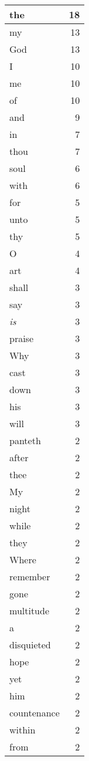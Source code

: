 \begin{center}
\begin{longtable}{l|r}
\hline \hline
\endlastfoot
the & 18 \\ \hline
my & 13 \\ \hline
God & 13 \\ \hline
I & 10 \\ \hline
me & 10 \\ \hline
of & 10 \\ \hline
and & 9 \\ \hline
in & 7 \\ \hline
thou & 7 \\ \hline
soul & 6 \\ \hline
with & 6 \\ \hline
for & 5 \\ \hline
unto & 5 \\ \hline
thy & 5 \\ \hline
O & 4 \\ \hline
art & 4 \\ \hline
shall & 3 \\ \hline
say & 3 \\ \hline
\emph{is} & 3 \\ \hline
praise & 3 \\ \hline
Why & 3 \\ \hline
cast & 3 \\ \hline
down & 3 \\ \hline
his & 3 \\ \hline
will & 3 \\ \hline
panteth & 2 \\ \hline
after & 2 \\ \hline
thee & 2 \\ \hline
My & 2 \\ \hline
night & 2 \\ \hline
while & 2 \\ \hline
they & 2 \\ \hline
Where & 2 \\ \hline
remember & 2 \\ \hline
gone & 2 \\ \hline
multitude & 2 \\ \hline
a & 2 \\ \hline
disquieted & 2 \\ \hline
hope & 2 \\ \hline
yet & 2 \\ \hline
him & 2 \\ \hline
countenance & 2 \\ \hline
within & 2 \\ \hline
from & 2 \\ \hline

\end{longtable}
\end{center}
